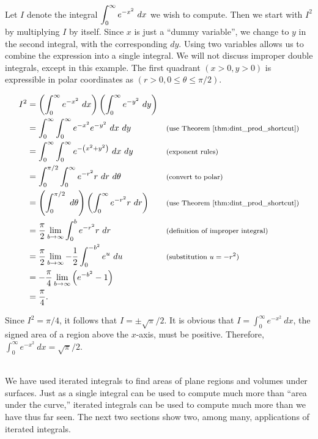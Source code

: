{Let $I$ denote the integral $\displaystyle \int_0^{\infty} e^{-x^2}\ dx$ we wish to compute.  Then we start with $I^2$ by multiplying $I$ by itself.  Since $x$ is just a ``dummy variable'', we change to $y$ in the second integral, with the corresponding $dy$.  Using two variables allows us to combine the expression into a single integral.  We will not discuss improper double integrals, except in this example.  The first quadrant $(x>0,y>0)$ is expressible in polar coordinates as $(r>0, 0\leq \theta\leq \pi/2)$.

\begin{align*}
		I^2 &= \left(\int_0^{\infty} e^{-x^2}\ dx\right)\left(\int_0^{\infty} e^{-y^2}\ dy\right) & &  \\
						&=\int_0^{\infty} \int_0^{\infty} e^{-x^2}e^{-y^2}\ dx\ dy  & & \text{\footnotesize (use Theorem~\ref{thm:dint_prod_shortcut})}\\
						&= \int_0^{\infty} \int_0^{\infty} e^{-\left(x^2+y^2\right)}\ dx\ dy & & \text{\footnotesize (exponent rules)}\\
						&= \int_0^{\pi/2} \int_0^\infty e^{-r^2} r\ dr\ d\theta & & \text{\footnotesize (convert to polar)}\\
						&= \left(\int_0^{\pi/2} \ d\theta\right)\left(\int_0^\infty e^{-r^2} r\ dr\right) & & \text{\footnotesize (use Theorem~\ref{thm:dint_prod_shortcut})}\\
&= \frac{\pi}{2}\lim_{b\to\infty}\int_0^b e^{-r^2} r\ dr & & \text{\footnotesize (definition of improper integral)}\\
						&= \frac{\pi}{2}\lim_{b\to\infty}-\frac{1}{2}\int_0^{-b^2} e^u\ du & & \text{\footnotesize (substitution $u=-r^2$)}\\
&= -\frac{\pi}{4}\lim_{b\to\infty}\left(e^{-b^2} - 1\right) \\
&= \frac{\pi}{4}.
		\end{align*}

Since $I^2=\pi/4$, it follows that $I=\pm \sqrt{\pi}/2$.  It is obvious that $I=\int_0^{\infty} e^{-x^2}\ dx$, the signed area of a region above the $x$-axis, must be positive.  Therefore,\\$\int_0^{\infty} e^{-x^2}\ dx = \sqrt{\pi}/2$.
}\\

We have used iterated integrals to find areas of plane regions and volumes under surfaces. Just as a single integral can be used to compute much more than ``area under the curve,'' iterated integrals can be used to compute much more than we have thus far seen. The next two sections show two, among many, applications of iterated integrals.

